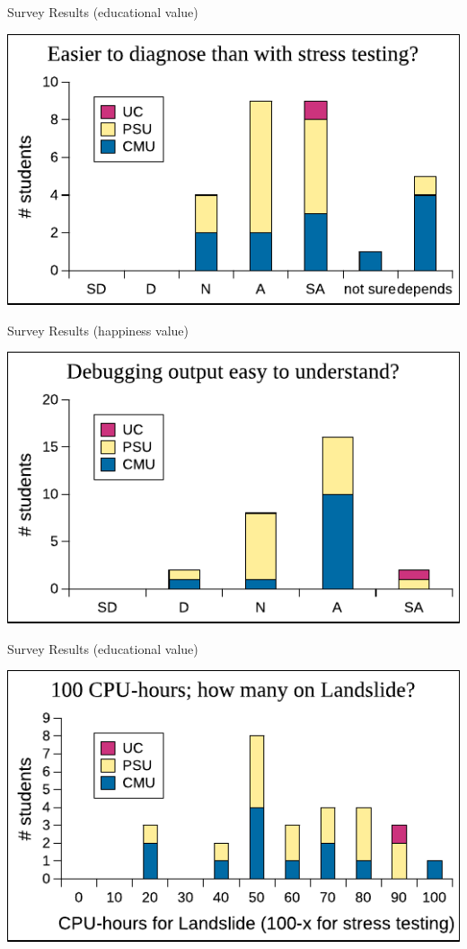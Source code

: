 \documentclass[xcolor=dvipsnames]{beamer}
\begin{document}
\begin{frame}{Survey Results (educational value)}
	\begin{center}
		\includegraphics[width=\textwidth]{../survey6.pdf} %
	\end{center}
\end{frame}

\begin{frame}{Survey Results (happiness value)}
	\begin{center}
		\includegraphics[width=\textwidth]{../survey5.pdf} %
	\end{center}
\end{frame}

\begin{frame}{Survey Results (educational value)}
	\begin{center}
		\includegraphics[width=\textwidth]{../survey9.pdf} %
	\end{center}
\end{frame}
\end{document}

